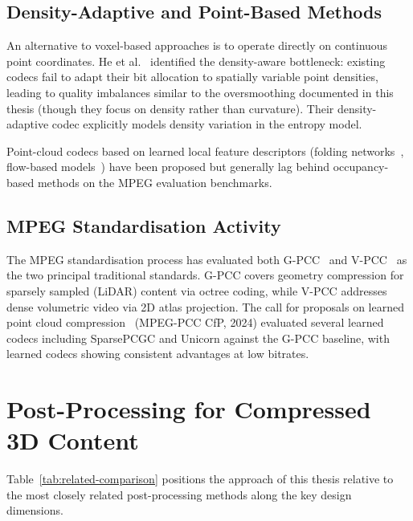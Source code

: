\subsection{Density-Adaptive and Point-Based Methods}

An alternative to voxel-based approaches is to operate directly on
continuous point coordinates.
He et al.~\cite{he2022density} identified the density-aware bottleneck:
existing codecs fail to adapt their bit allocation to spatially variable
point densities, leading to quality imbalances similar to the oversmoothing
documented in this thesis (though they focus on density rather than curvature).
Their density-adaptive codec explicitly models density variation in the
entropy model.

Point-cloud codecs based on learned local feature descriptors (folding
networks~\cite{yang2018foldingnet}, flow-based
models~\cite{yang2019pointflow}) have been proposed but generally lag behind
occupancy-based methods on the MPEG evaluation benchmarks.

\subsection{MPEG Standardisation Activity}

The MPEG standardisation process has evaluated both G-PCC~\cite{graziosi2020gpcc}
and V-PCC~\cite{schwarz2018emerging} as the two principal traditional
standards.
G-PCC covers geometry compression for sparsely sampled (LiDAR) content
via octree coding, while V-PCC addresses dense volumetric video via 2D atlas
projection.
The call for proposals on learned point cloud compression~\cite{mpeg2024cfp}
(MPEG-PCC CfP, 2024) evaluated several learned codecs including SparsePCGC
and Unicorn against the G-PCC baseline, with learned codecs showing
consistent advantages at low bitrates.

\section{Post-Processing for Compressed 3D Content}
\label{sec:related-postprocessing}

Table~\ref{tab:related-comparison} positions the approach of this thesis
relative to the most closely related post-processing methods along the
key design dimensions.

